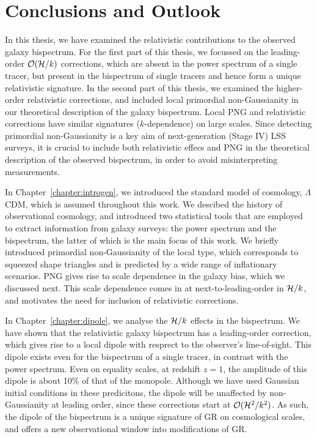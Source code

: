 
\chapter{Conclusions and Outlook}
\label{chapter:summary}
In this thesis, we have examined the relativistic contributions to the observed galaxy bispectrum. For the first part of this thesis, we focussed on the leading-order $\mathcal{O}(\mathcal{H}/k)$ corrections, which are absent in the power spectrum of a single tracer, but present in the bispectrum of single tracers and hence form a unique relativistic signature. In the second part of this thesis, we examined the higher-order relativistic corrections, and included local primordial non-Gaussianity in our theoretical description of the galaxy bispectrum. Local PNG and relativistic corrections have similar signatures ($k$-dependence) on large scales. Since detecting primordial non-Gaussianity is a key aim of next-generation (Stage IV) LSS surveys, it is crucial to include both relativistic effecs and PNG in the theoretical description of the observed bispectrum, in order to avoid misinterpreting measurements.

In Chapter~\ref{chapter:introgen}, we introduced the standard model of cosmology, $\Lambda$CDM, which is assumed throughout this work. We descibed the history of observational cosmology, and introduced two statistical tools that are employed to extract information from galaxy surveys: the power spectrum and the bispectrum, the latter of which is the main focus of this work. We briefly introduced primordial non-Gaussianity of the local type, which corresponds to squeezed shape triangles and is predicted by a wide range of inflationary scenarios. PNG gives rise to scale dependence in the galaxy bias, which we discussed next. This scale dependence comes in at next-to-leading-order in $\mathcal{H}/k$, and motivates the need for inclusion of relativistic corrections.

In Chapter~\ref{chapter:dipole}, we analyse the $\mathcal{H}/k$ effects in the bispectrum. We have shown that the relativistic galaxy bispectrum has a leading-order correction, which gives rise to a local dipole with resprect to the observer's line-of-sight. This dipole exists even for the bispectrum of a single tracer, in contrast with the power spectrum. Even on equality scales, at redshift $z=1$, the amplitude of this dipole is about 10\% of that of the monopole. Although we have used Gaussian initial conditions in these predicitons, the dipole will be unaffected by non-Gaussianity at leading order, since these corrections start at $\mathcal{O}(\mathcal{H}^2/k^2)$. As such, the dipole of the bispectrum is a unique signature of GR on cosmological scales, and offers a new observational window into modifications of GR.

